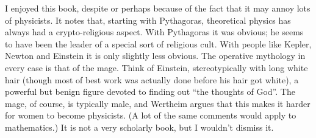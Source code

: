 \documentclass{article}
\def\tightlist{}
\renewcommand{\texttt}[1]{%
  \begingroup
  \ttfamily
  \begingroup\lccode`~=`/\lowercase{\endgroup\def~}{/\discretionary{}{}{}}%
  \begingroup\lccode`~=`[\lowercase{\endgroup\def~}{[\discretionary{}{}{}}%
  \begingroup\lccode`~=`.\lowercase{\endgroup\def~}{.\discretionary{}{}{}}%
  \catcode`/=\active\catcode`[=\active\catcode`.=\active
  \scantokens{#1\noexpand}%
  \endgroup
}
\begin{document}
I enjoyed this book, despite or perhaps because of the fact that it may
annoy lots of physicists. It notes that, starting with Pythagoras,
theoretical physics has always had a crypto-religious aspect. With
Pythagoras it was obvious; he seems to have been the leader of a special
sort of religious cult. With people like Kepler, Newton and Einstein it
is only slightly less obvious. The operative mythology in every case is
that of the mage. Think of Einstein, stereotypically with long white
hair (though most of best work was actually done before his hair got
white), a powerful but benign figure devoted to finding out ``the
thoughts of God''. The mage, of course, is typically male, and Wertheim
argues that this makes it harder for women to become physicists. (A lot
of the same comments would apply to mathematics.) It is not a very
scholarly book, but I wouldn't dismiss it.

\end{document}
